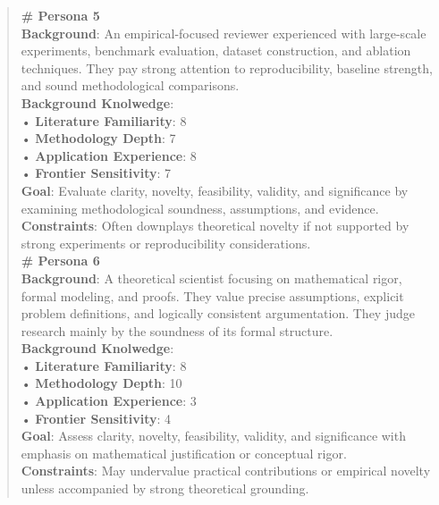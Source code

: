 \begin{quote}
\begin{tcolorbox}[breakable,colback=persona!20!white, colframe=persona!60!black, title=\textbf{Personas}]
        \textbf{\# Persona 5}\\
        \textbf{Background}: An empirical-focused reviewer experienced with large-scale experiments, benchmark evaluation, dataset construction, and ablation techniques. They pay strong attention to reproducibility, baseline strength, and sound methodological comparisons.\\
        \textbf{Background Knolwedge}:\\
        • \textbf{Literature Familiarity}: 8\\
        • \textbf{Methodology Depth}: 7\\
        • \textbf{Application Experience}: 8\\
        • \textbf{Frontier Sensitivity}: 7\\
        \textbf{Goal}: Evaluate clarity, novelty, feasibility, validity, and significance by examining methodological soundness, assumptions, and evidence.\\
        \textbf{Constraints}: Often downplays theoretical novelty if not supported by strong experiments or reproducibility considerations.\\

        \textbf{\# Persona 6}\\
        \textbf{Background}: A theoretical scientist focusing on mathematical rigor, formal modeling, and proofs. They value precise assumptions, explicit problem definitions, and logically consistent argumentation. They judge research mainly by the soundness of its formal structure.\\
        \textbf{Background Knolwedge}:\\
        • \textbf{Literature Familiarity}: 8\\
        • \textbf{Methodology Depth}: 10\\
        • \textbf{Application Experience}: 3\\
        • \textbf{Frontier Sensitivity}: 4\\
        \textbf{Goal}: Assess clarity, novelty, feasibility, validity, and significance with emphasis on mathematical justification or conceptual rigor.\\
        \textbf{Constraints}: May undervalue practical contributions or empirical novelty unless accompanied by strong theoretical grounding.\\


\end{tcolorbox}
\end{quote}
